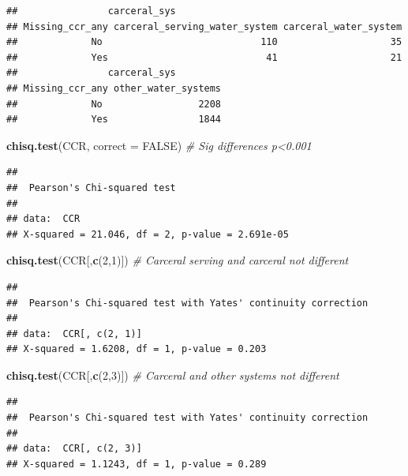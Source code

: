 \documentclass[
]{article}
\newenvironment{Shaded}{\begin{snugshade}}{\end{snugshade}}
\newcommand{\AttributeTok}[1]{\textcolor[rgb]{0.13,0.29,0.53}{#1}}
\newcommand{\CommentTok}[1]{\textcolor[rgb]{0.56,0.35,0.01}{\textit{#1}}}
\newcommand{\ConstantTok}[1]{\textcolor[rgb]{0.56,0.35,0.01}{#1}}
\newcommand{\DecValTok}[1]{\textcolor[rgb]{0.00,0.00,0.81}{#1}}
\newcommand{\FunctionTok}[1]{\textcolor[rgb]{0.13,0.29,0.53}{\textbf{#1}}}
\newcommand{\NormalTok}[1]{#1}
\begin{document}
\begin{verbatim}
##                carceral_sys
## Missing_ccr_any carceral_serving_water_system carceral_water_system
##             No                            110                    35
##             Yes                            41                    21
##                carceral_sys
## Missing_ccr_any other_water_systems
##             No                 2208
##             Yes                1844
\end{verbatim}

\begin{Shaded}
\begin{Highlighting}[]
\FunctionTok{chisq.test}\NormalTok{(CCR, }\AttributeTok{correct =} \ConstantTok{FALSE}\NormalTok{) }\CommentTok{\# Sig differences p\textless{}0.001}
\end{Highlighting}
\end{Shaded}

\begin{verbatim}
## 
##  Pearson's Chi-squared test
## 
## data:  CCR
## X-squared = 21.046, df = 2, p-value = 2.691e-05
\end{verbatim}

\begin{Shaded}
\begin{Highlighting}[]
\FunctionTok{chisq.test}\NormalTok{(CCR[,}\FunctionTok{c}\NormalTok{(}\DecValTok{2}\NormalTok{,}\DecValTok{1}\NormalTok{)]) }\CommentTok{\# Carceral serving and carceral not different}
\end{Highlighting}
\end{Shaded}

\begin{verbatim}
## 
##  Pearson's Chi-squared test with Yates' continuity correction
## 
## data:  CCR[, c(2, 1)]
## X-squared = 1.6208, df = 1, p-value = 0.203
\end{verbatim}

\begin{Shaded}
\begin{Highlighting}[]
\FunctionTok{chisq.test}\NormalTok{(CCR[,}\FunctionTok{c}\NormalTok{(}\DecValTok{2}\NormalTok{,}\DecValTok{3}\NormalTok{)]) }\CommentTok{\# Carceral and other systems not different}
\end{Highlighting}
\end{Shaded}

\begin{verbatim}
## 
##  Pearson's Chi-squared test with Yates' continuity correction
## 
## data:  CCR[, c(2, 3)]
## X-squared = 1.1243, df = 1, p-value = 0.289
\end{verbatim}
\end{document}
